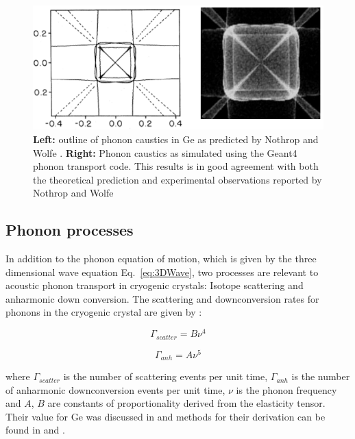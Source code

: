 \documentclass[preprint,12pt]{elsarticle}
\begin{document}
\begin{figure}
	\centering
		\includegraphics[width=1.0\textwidth]{caustics.png}
	\caption{\textbf{Left:} outline of phonon caustics in Ge as predicted by Nothrop and Wolfe \cite{Nothrop}. \textbf{Right:} Phonon caustics as simulated using the Geant4 phonon transport code. This results is in good agreement with both the theoretical prediction and experimental observations reported by Nothrop and Wolfe \cite{Nothrop} }
	\label{fig:caustics}
\end{figure}

\subsection{Phonon processes}
\label{sec:Processes}

In addition to the phonon equation of motion, which is given by the three dimensional wave equation Eq.~\ref{eq:3DWave}, two processes are relevant to acoustic phonon transport in cryogenic crystals: Isotope scattering and anharmonic down conversion\cite{Tamura1}\cite{Tamura2}\cite{Tamura3}. The scattering and downconversion rates for phonons in the cryogenic crystal are given by \cite{Tamura2}:

\begin{equation}
\label{eq:ScatterRate}
\Gamma_{scatter} = B\nu^4
\end{equation}

\begin{equation}
\label{eq:anhRate}
\Gamma_{anh} = A\nu^5
\end{equation}

where $\Gamma_{scatter}$ is the number of scattering events per unit time, $\Gamma_{anh}$ is the number of anharmonic downconversion events per unit time, $\nu$ is the phonon frequency and $A$, $B$ are constants of proportionality derived from the elasticity tensor. Their value for Ge was discussed in \cite{Brandt} and methods for their derivation can be found in \cite{Tamura1} and \cite{Tamura2}.
\end{document}
